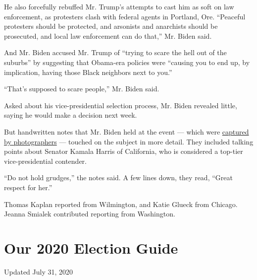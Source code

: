He also forcefully rebuffed Mr. Trump's attempts to cast him as soft on
law enforcement, as protesters clash with federal agents in Portland,
Ore. ``Peaceful protesters should be protected, and arsonists and
anarchists should be prosecuted, and local law enforcement can do
that,'' Mr. Biden said.

And Mr. Biden accused Mr. Trump of ``trying to scare the hell out of the
suburbs'' by suggesting that Obama-era policies were ``causing you to
end up, by implication, having those Black neighbors next to you.''

``That's supposed to scare people,'' Mr. Biden said.

Asked about his vice-presidential selection process, Mr. Biden revealed
little, saying he would make a decision next week.

But handwritten notes that Mr. Biden held at the event --- which were
\href{https://apnews.com/d3fc8b88cde56bac9f1e7b5e494fb019}{captured by
photographers} --- touched on the subject in more detail. They included
talking points about Senator Kamala Harris of California, who is
considered a top-tier vice-presidential contender.

``Do not hold grudges,'' the notes said. A few lines down, they read,
``Great respect for her.''

Thomas Kaplan reported from Wilmington, and Katie Glueck from Chicago.
Jeanna Smialek contributed reporting from Washington.

\hypertarget{our-2020-election-guide}{%
\section{Our 2020 Election Guide}\label{our-2020-election-guide}}

Updated July 31, 2020

